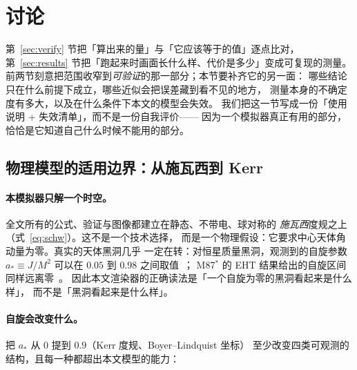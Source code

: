 \section{讨论}\label{sec:discuss}

第~\ref{sec:verify} 节把「算出来的量」与「它应该等于的值」逐点比对，
第~\ref{sec:results} 节把「跑起来时画面长什么样、代价是多少」变成可复现的测量。
前两节刻意把范围收窄到\emph{可验证}的那一部分；本节要补齐它的另一面：
哪些结论只在什么前提下成立，哪些近似会把误差藏到看不见的地方，
测量本身的不确定度有多大，以及在什么条件下本文的模型会失效。
我们把这一节写成一份「使用说明 + 失效清单」，而不是一份自我评价——
因为一个模拟器真正有用的部分，恰恰是它知道自己什么时候不能用的部分。

\subsection{物理模型的适用边界：从施瓦西到 Kerr}\label{sec:discuss-phys}

\paragraph{本模拟器只解一个时空。}
全文所有的公式、验证与图像都建立在静态、不带电、球对称的
\emph{施瓦西}度规之上（式~\eqref{eq:schw}）。这不是一个技术选择，
而是一个物理假设：它要求中心天体角动量为零。真实的天体黑洞几乎
一定在转：对恒星质量黑洞，观测到的自旋参数 $a_\ast\equiv J/M^2$
可以在 $0.05$ 到 $0.98$ 之间取值~\cite{thorne1974}；
M87$^\ast$ 的 EHT 结果给出的自旋区间同样远离零~\cite{eht2019}。
因此本文渲染器的正确读法是「一个自旋为零的黑洞看起来是什么样」，
而不是「黑洞看起来是什么样」。

\paragraph{自旋会改变什么。}
把 $a_\ast$ 从 $0$ 提到 $0.9$（Kerr 度规、Boyer--Lindquist 坐标）
至少改变四类可观测的结构，且每一种都超出本文模型的能力：

